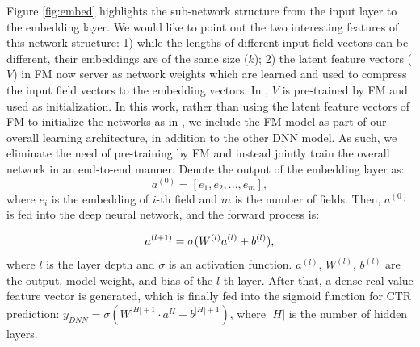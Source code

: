 Figure \ref{fig:embed} highlights the sub-network structure from the input layer to the embedding layer. We would like to point out the two interesting features of this network structure: 1) while the lengths of different input field vectors can be different, their embeddings are of the same size ($k$); 2) the latent feature vectors ($V$) in FM now server as network weights which are learned and used to compress the input field vectors to the embedding vectors. In \cite{fnn}, $V$ is pre-trained by FM and used as initialization. In this work, rather than using the latent feature vectors of FM to initialize the networks as in \cite{fnn}, we include the FM model as part of our overall learning architecture, in addition to the other DNN model. As such, we eliminate the need of pre-training by FM and instead jointly train the overall network in an end-to-end manner.
Denote the output of the embedding layer as:
\begin{equation}
\label{eq:embed}
a^{(0)}=[e_{1},e_{2},...,e_{m}],
 \end{equation}
where $e_{i}$ is the embedding of $i$-th field and $m$ is the number of fields. Then, $a^{(0)}$ is fed into the deep neural network, and the forward process is:



\begin{equation}
\centering
\label{eq:h2h}
a^{(l+1)} = \sigma(W^{(l)}a^{(l)} + b^{(l)}),
\end{equation}
where $l$ is the layer depth and $\sigma$ is an activation function. $a^{(l)}$, $W^{(l)}$, $b^{(l)}$ are the output, model weight, and bias of the $l$-th layer. After that, a dense real-value feature vector is generated, which is finally fed into the sigmoid function for CTR prediction: $y_{DNN}=\sigma({W^{|H|+1}\cdot a^{H}+b^{|H|+1}})$, where $|H|$ is the number of hidden layers.



